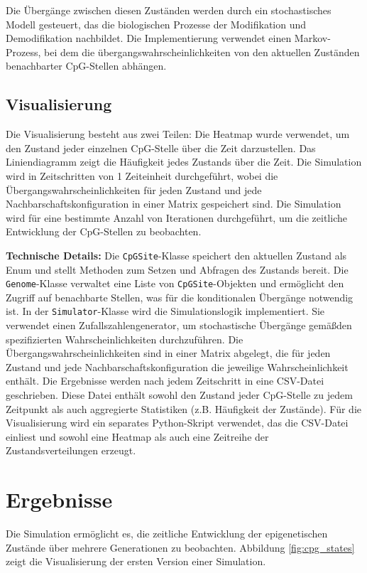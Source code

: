 \documentclass{SeminarV2}
\begin{document}
Die \"{U}berg\"{a}nge zwischen diesen Zust\"{a}nden 
werden durch ein stochastisches Modell gesteuert, das die 
biologischen Prozesse der Modifikation und Demodifikation nachbildet. 
Die Implementierung verwendet einen Markov-Prozess, bei dem die 
\"{u}bergangswahrscheinlichkeiten von den aktuellen Zust\"{a}nden benachbarter CpG-Stellen abh\"{a}ngen.

\subsection{Visualisierung}

Die Visualisierung besteht aus zwei Teilen: Die Heatmap wurde verwendet, um den Zustand jeder einzelnen CpG-Stelle \"{u}ber die Zeit darzustellen.
Das Liniendiagramm zeigt die H\"{a}ufigkeit jedes Zustands \"{u}ber die Zeit.
Die Simulation wird in Zeitschritten von 1 Zeiteinheit durchgef\"{u}hrt, wobei die \"{U}bergangswahrscheinlichkeiten f\"{u}r jeden Zustand und jede Nachbarschaftskonfiguration in einer Matrix gespeichert sind. Die Simulation wird f\"{u}r eine bestimmte Anzahl von Iterationen durchgef\"{u}hrt, um die zeitliche Entwicklung der CpG-Stellen zu beobachten.

\textbf{Technische Details:}
Die \texttt{CpGSite}-Klasse speichert den aktuellen Zustand als Enum und stellt Methoden zum Setzen und Abfragen des Zustands bereit.
Die \texttt{Genome}-Klasse verwaltet eine Liste von \texttt{CpGSite}-Objekten und erm\"{o}glicht den Zugriff auf benachbarte Stellen, was f\"{u}r die konditionalen \"{U}berg\"{a}nge notwendig ist.
In der \texttt{Simulator}-Klasse wird die Simulationslogik implementiert. Sie verwendet einen Zufallszahlengenerator, um stochastische \"{U}berg\"{a}nge gem\"{a}\ss den spezifizierten Wahrscheinlichkeiten durchzuf\"{u}hren. Die \"{U}bergangswahrscheinlichkeiten sind in einer Matrix abgelegt, die f\"{u}r jeden Zustand und jede Nachbarschaftskonfiguration die jeweilige Wahrscheinlichkeit enth\"{a}lt.
Die Ergebnisse werden nach jedem Zeitschritt in eine CSV-Datei geschrieben. Diese Datei enth\"{a}lt sowohl den Zustand jeder CpG-Stelle zu jedem Zeitpunkt als auch aggregierte Statistiken (z.B. H\"{a}ufigkeit der Zust\"{a}nde).
F\"{u}r die Visualisierung wird ein separates Python-Skript verwendet, das die CSV-Datei einliest und sowohl eine Heatmap als auch eine Zeitreihe der Zustandsverteilungen erzeugt.

\section{Ergebnisse}
Die Simulation erm\"{o}glicht es, die zeitliche Entwicklung der epigenetischen Zust\"{a}nde 
\"{u}ber mehrere Generationen zu beobachten. Abbildung \ref{fig:cpg_states} zeigt die Visualisierung der ersten Version einer Simulation.
\end{document}
